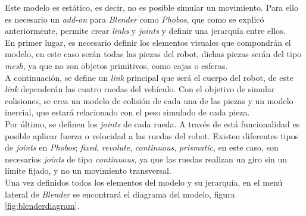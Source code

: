 Este modelo es estático, es decir, no es posible simular un movimiento. Para ello es necesario un \textit{add-on} para \textit{Blender} como \textit{Phobos}, que como se explicó
anteriormente, permite crear \textit{links} y \textit{joints} y definir una jerarquía entre ellos.\\

En primer lugar, es necesario definir los elementos visuales que compondrán el modelo, en este caso serán todas las piezas del robot, dichas piezas serán del tipo \textit{mesh},
ya que no son objetos primitivos, como cajas o esferas.\\

A continuación, se define un \textit{link} principal que será el cuerpo del robot, de este \textit{link} dependerán las cuatro ruedas del vehículo. Con el objetivo de simular
colisiones, se crea un modelo de colisión de cada una de
las piezas y un modelo inercial, que estará relacionado con el peso simulado de cada pieza.\\

Por último, se definen los \textit{joints} de cada rueda. A través de está funcionalidad es posible aplicar fuerza o velocidad a las ruedas del robot. Existen diferentes tipos de
\textit{joints} en \textit{Phobos}; \textit{fixed}, \textit{revolute}, \textit{continuous}, \textit{prismatic}, en este caso, son necesarios \textit{joints} de tipo
\textit{continuous}, ya que las ruedas realizan un giro sin un límite fijado, y no un movimiento transversal.\\

Una vez definidos todos los elementos del modelo y su jerarquía, en el menú lateral de \textit{Blender} se encontrará el diagrama del modelo, figura \ref{fig:blenderdiagram}.\\

